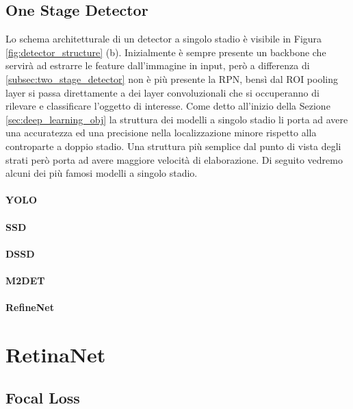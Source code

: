 \subsection{One Stage Detector}
\label{subsec:one_stage_detector}
Lo schema architetturale di un detector a singolo stadio è visibile in Figura \ref{fig:detector_structure} (b). Inizialmente è sempre presente un backbone che servirà ad estrarre le feature dall'immagine in input, però a differenza di \ref{subsec:two_stage_detector} non è più presente la \ac{RPN}, bensì dal \ac{ROI} pooling layer si passa direttamente a dei layer convoluzionali che si occuperanno di rilevare e classificare l'oggetto di interesse. Come detto all'inizio della Sezione \ref{sec:deep_learning_obj} la struttura dei modelli a singolo stadio li porta ad avere una accuratezza ed una precisione nella localizzazione minore rispetto alla controparte a doppio stadio. Una struttura più semplice dal punto di vista degli strati però porta ad avere maggiore velocità di elaborazione. Di seguito vedremo alcuni dei più famosi modelli a singolo stadio. 
\paragraph{YOLO}
\paragraph{SSD}
\paragraph{DSSD}
\paragraph{M2DET}
\paragraph{RefineNet}

\section{RetinaNet}
\label{sec:retinanet}
\subsection{Focal Loss}